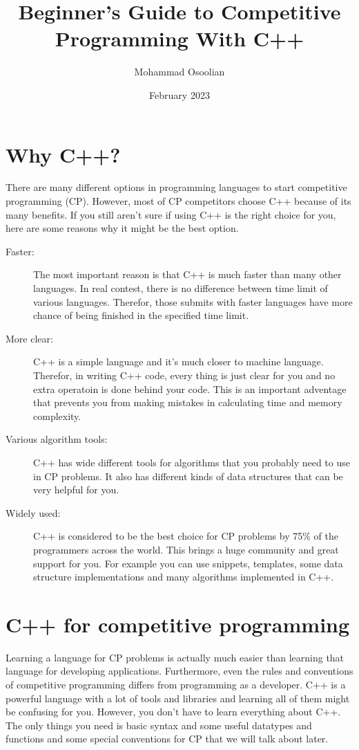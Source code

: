 \documentclass[12pt, a4paper]{article}
\title{Beginner's Guide to Competitive Programming With C++}
\author{Mohammad Osoolian}
\date{February 2023}
\begin{document}
\maketitle
\tableofcontents
\newpage

\section{Why C++?}
There are many different options in programming languages to start competitive programming (CP). However, most of CP competitors choose C++ because of its many benefits. If you still aren't sure if using C++ is the right choice for you, here are some reasons why it might be the best option.
\begin{description}
\item[Faster:] The most important reason is that C++ is much faster than many other languages. In real contest, there is no difference between time limit of various languages. Therefor, those submits with faster languages have more chance of being finished in the specified time limit.
\item[More clear:] C++ is a simple language and it's much closer to machine language. Therefor, in writing C++ code, every thing is just clear for you and no extra operatoin is done behind your code. This is an important adventage that prevents you from making mistakes in calculating time and memory complexity.
\item[Various algorithm tools:] C++ has wide different tools for algorithms that you probably need to use in CP problems. It also has different kinds of data structures that can be very helpful for you.
\item[Widely used:]  C++ is considered to be the best choice for CP problems by 75\% of the programmers across the world. This brings a huge community and great support for you. For example you can use snippets, templates, some data structure implementations and many algorithms implemented in C++.
\end{description}

\section{C++ for competitive programming}
Learning a language for CP problems is actually much easier than learning that language for developing applications. Furthermore, even the rules and conventions of competitive programming differs from programming as a developer. C++ is a powerful language with a lot of tools and libraries and learning all of them might be confusing for you. However, you don't have to learn everything about C++. The only things you need is basic syntax and some useful datatypes and functions and some special conventions for CP that we will talk about later.
\end{document}
